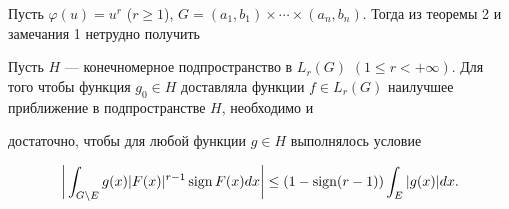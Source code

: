  


 


\begin{note} 


Пусть $\varphi(u)=u^r$ ($r\ge1$), $G=(a_1,b_1)\times \dotsb \times 


(a_n,b_n)$. Тогда из теоремы 2 и замечания 1 нетрудно получить 


\end{note} 


 


 


\begin{assrtnonum} 


Пусть $H$ --- конечномерное подпространство в $L_r(G)$ $(1\le 


r<+\infty)$. Для того чтобы функция $g_0\in H$ доставляла функции $f\in 


L_r(G)$ наилучшее приближение в подпространстве $H$, необходимо и 


достаточно, чтобы для любой функции $g\in H$ выполнялось условие 


\begin{equation} 


\bigg|\int_{G\setminus E}g(x)|F(x)|^{r-1}\sign F(x)dx\bigg|\le 


(1-\sign(r-1))\int_E|g(x)|dx. 


\end{equation} 


\end{assrtnonum} 


 


 


